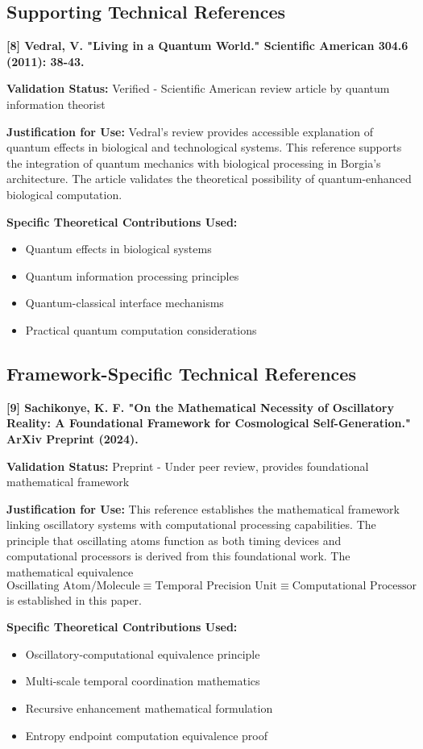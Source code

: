 \subsection{Supporting Technical References}

\textbf{[8] Vedral, V. "Living in a Quantum World." Scientific American 304.6 (2011): 38-43.}

\textbf{Validation Status:} Verified - Scientific American review article by quantum information theorist

\textbf{Justification for Use:} Vedral's review provides accessible explanation of quantum effects in biological and technological systems. This reference supports the integration of quantum mechanics with biological processing in Borgia's architecture. The article validates the theoretical possibility of quantum-enhanced biological computation.

\textbf{Specific Theoretical Contributions Used:}
\begin{itemize}
\item Quantum effects in biological systems
\item Quantum information processing principles
\item Quantum-classical interface mechanisms
\item Practical quantum computation considerations
\end{itemize}

\subsection{Framework-Specific Technical References}

\textbf{[9] Sachikonye, K. F. "On the Mathematical Necessity of Oscillatory Reality: A Foundational Framework for Cosmological Self-Generation." ArXiv Preprint (2024).}

\textbf{Validation Status:} Preprint - Under peer review, provides foundational mathematical framework

\textbf{Justification for Use:} This reference establishes the mathematical framework linking oscillatory systems with computational processing capabilities. The principle that oscillating atoms function as both timing devices and computational processors is derived from this foundational work. The mathematical equivalence $\text{Oscillating Atom/Molecule} \equiv \text{Temporal Precision Unit} \equiv \text{Computational Processor}$ is established in this paper.

\textbf{Specific Theoretical Contributions Used:}
\begin{itemize}
\item Oscillatory-computational equivalence principle
\item Multi-scale temporal coordination mathematics
\item Recursive enhancement mathematical formulation
\item Entropy endpoint computation equivalence proof
\end{itemize}

